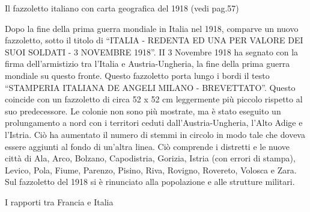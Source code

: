 Il fazzoletto italiano con carta geografica del 1918 (vedi pag.57)

Dopo la fine della prima guerra mondiale in Italia nel 1918, comparve un
nuovo fazzoletto, sotto il titolo di ``ITALIA - REDENTA ED UNA PER
VALORE DEI SUOI SOLDATI - 3 NOVEMBRE 1918''. II 3 Novembre 1918 ha
segnato con la firma dell'armistizio tra l'Italia e Austria-Ungheria, la
fine della prima guerra mondiale su questo fronte. Questo fazzoletto
porta lungo i bordi il testo ``STAMPERIA ITALIANA DE ANGELI MILANO -
BREVETTATO''. Questo coincide con un fazzoletto di circa 52 x 52 cm
leggermente più piccolo rispetto al suo predecessore. Le colonie non
sono più mostrate, ma è stato eseguito un prolungamento a nord con i
territori ceduti dall'Austria-Ungheria, l'Alto Adige e l'Istria. Ciò ha
aumentato il numero di stemmi in circolo in modo tale che doveva essere
aggiunti al fondo di un'altra linea. Ciò comprende i distretti e le
nuove città di Ala, Arco, Bolzano, Capodistria, Gorizia, Istria (con
errori di stampa), Levico, Pola, Fiume, Parenzo, Pisino, Riva, Rovigno,
Rovereto, Volosca e Zara. Sul fazzoletto del 1918 si è rinunciato alla
popolazione e alle strutture militari.

I rapporti tra Francia e Italia

